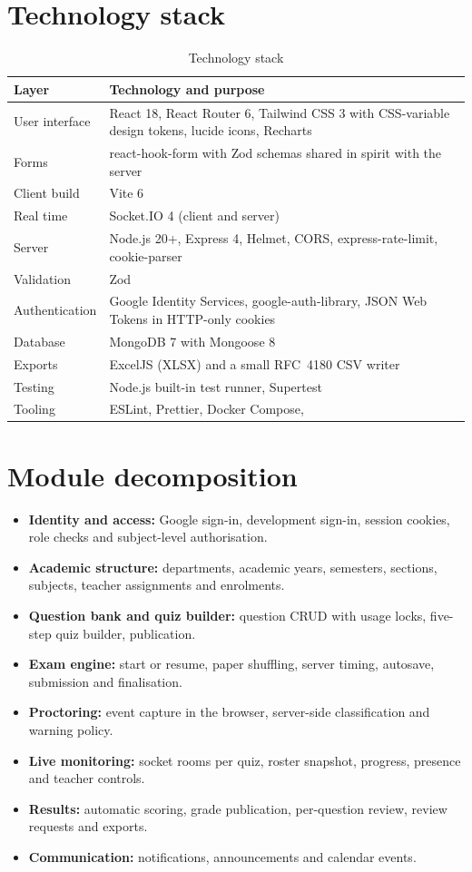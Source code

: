 \documentclass[12pt,a4paper,oneside]{report}
\newcommand{\code}[1]{\texttt{\detokenize{#1}}}
\begin{document}
\section{Technology stack}
\begin{table}[htbp]\centering
\caption{Technology stack}\label{tab:stack}
\begin{tabularx}{\linewidth}{@{}lX@{}}
\toprule
\textbf{Layer} & \textbf{Technology and purpose}\\ \midrule
User interface & React 18, React Router 6, Tailwind CSS 3 with CSS-variable design tokens, lucide icons, Recharts\\
Forms & react-hook-form with Zod schemas shared in spirit with the server\\
Client build & Vite 6\\
Real time & Socket.IO 4 (client and server)\\
Server & Node.js 20+, Express 4, Helmet, CORS, express-rate-limit, cookie-parser\\
Validation & Zod\\
Authentication & Google Identity Services, google-auth-library, JSON Web Tokens in HTTP-only cookies\\
Database & MongoDB 7 with Mongoose 8\\
Exports & ExcelJS (XLSX) and a small RFC~4180 CSV writer\\
Testing & Node.js built-in test runner, Supertest\\
Tooling & ESLint, Prettier, Docker Compose, \code{run.sh}\\
\bottomrule
\end{tabularx}
\end{table}

\section{Module decomposition}
\begin{itemize}
  \item \textbf{Identity and access:} Google sign-in, development sign-in, session cookies, role checks and subject-level authorisation.
  \item \textbf{Academic structure:} departments, academic years, semesters, sections, subjects, teacher assignments and enrolments.
  \item \textbf{Question bank and quiz builder:} question CRUD with usage locks, five-step quiz builder, publication.
  \item \textbf{Exam engine:} start or resume, paper shuffling, server timing, autosave, submission and finalisation.
  \item \textbf{Proctoring:} event capture in the browser, server-side classification and warning policy.
  \item \textbf{Live monitoring:} socket rooms per quiz, roster snapshot, progress, presence and teacher controls.
  \item \textbf{Results:} automatic scoring, grade publication, per-question review, review requests and exports.
  \item \textbf{Communication:} notifications, announcements and calendar events.
\end{itemize}
\end{document}
